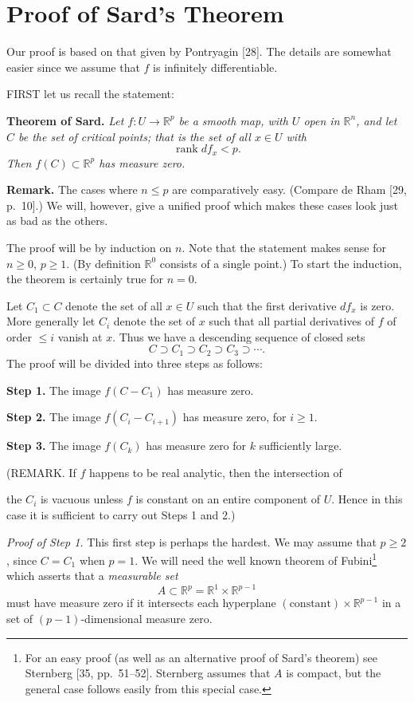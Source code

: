
\section{Proof of Sard's Theorem}

Our proof is based on that given by Pontryagin [28]. The details are somewhat easier since we assume that $f$ is infinitely differentiable.

FIRST let us recall the statement:

\noindent\textbf{Theorem of Sard.} \textit{Let $f : U \to \mathbb{R}^p$ be a smooth map, with $U$ open in $\mathbb{R}^n$, and let $C$ be the set of critical points; that is the set of all $x \in U$ with}
\[
\operatorname{rank} df_x < p.
\]
\textit{Then $f(C) \subset \mathbb{R}^p$ has measure zero.}

\noindent\textbf{Remark.} The cases where $n \leq p$ are comparatively easy. (Compare de Rham [29, p.~10].) We will, however, give a unified proof which makes these cases look just as bad as the others.

The proof will be by induction on $n$. Note that the statement makes sense for $n \geq 0$, $p \geq 1$. (By definition $\mathbb{R}^0$ consists of a single point.) To start the induction, the theorem is certainly true for $n = 0$.

Let $C_1 \subset C$ denote the set of all $x \in U$ such that the first derivative $df_x$ is zero. More generally let $C_i$ denote the set of $x$ such that all partial derivatives of $f$ of order $\leq i$ vanish at $x$. Thus we have a descending sequence of closed sets
\[
C \supset C_1 \supset C_2 \supset C_3 \supset \cdots.
\]
The proof will be divided into three steps as follows:

\noindent\textbf{Step 1.} The image $f(C - C_1)$ has measure zero.

\noindent\textbf{Step 2.} The image $f(C_i - C_{i+1})$ has measure zero, for $i \geq 1$.

\noindent\textbf{Step 3.} The image $f(C_k)$ has measure zero for $k$ sufficiently large.

(REMARK. If $f$ happens to be real analytic, then the intersection of



the $C_i$ is vacuous unless $f$ is constant on an entire component of $U$. Hence in this case it is sufficient to carry out Steps 1 and 2.)

\noindent\textit{Proof of Step 1.} This first step is perhaps the hardest. We may assume that $p \geq 2$, since $C = C_1$ when $p = 1$. We will need the well known theorem of Fubini\footnote{For an easy proof (as well as an alternative proof of Sard's theorem) see Sternberg [35, pp.~51--52]. Sternberg assumes that $A$ is compact, but the general case follows easily from this special case.} which asserts that a \emph{measurable set}
\[
A \subset \mathbb{R}^p = \mathbb{R}^1 \times \mathbb{R}^{p-1}
\]
must have measure zero if it intersects each hyperplane $(\text{constant}) \times \mathbb{R}^{p-1}$ in a set of $(p-1)$-dimensional measure zero.

